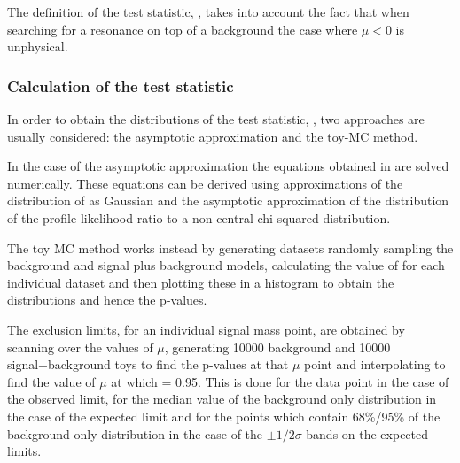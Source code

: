 The definition of the test statistic, \qmutilde, takes into account the fact that when searching 
for a resonance on top of a background the case where $\mu < 0$ is unphysical.

\subsubsection{Calculation of the test statistic}

In order to obtain the distributions of the test statistic, \qmutilde, two approaches are usually considered: the asymptotic approximation and the toy-MC method.

In the case of the asymptotic approximation the equations obtained in \cite{AsymLikelihood} are solved numerically. These equations can be derived using approximations  of the distribution of \muhat as Gaussian and the asymptotic approximation of the distribution of the profile likelihood ratio to a non-central chi-squared distribution. 

The toy MC method works instead by generating datasets randomly sampling the background and signal plus background models, calculating the value of \qmutilde for each individual dataset and then plotting these in a histogram to obtain the distributions and hence the p-values.

The exclusion limits, for an individual signal mass point, are obtained by scanning over the values of $\mu$, generating 10000 background and 10000 signal+background toys to find the p-values at that $\mu$ point and interpolating to find the value of $\mu$ at which \cls = 0.95. This is done for the data point in the case of the observed limit, for the median value of the background only distribution in the case of the expected limit and for the points which contain 68\%/95\% of the background only distribution in the case of the $\pm 1/2\sigma$ bands on the expected limits. 

